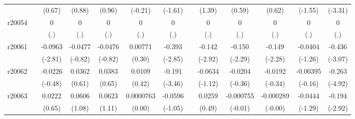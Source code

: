 {\begin{tabular}{l*{12}{c}}
            &                     &      (0.67)         &      (0.88)         &      (0.96)         &     (-0.21)         &     (-1.61)         &                     &      (1.39)         &      (0.59)         &      (0.62)         &     (-1.55)         &     (-3.31)         \\
[1em]
r20054      &                     &           0         &           0         &           0         &           0         &           0         &                     &           0         &           0         &           0         &           0         &           0         \\
            &                     &         (.)         &         (.)         &         (.)         &         (.)         &         (.)         &                     &         (.)         &         (.)         &         (.)         &         (.)         &         (.)         \\
[1em]
r20061      &                     &     -0.0963\sym{**} &     -0.0477         &     -0.0476         &     0.00771         &      -0.393\sym{**} &                     &      -0.142\sym{**} &      -0.150\sym{*}  &      -0.149\sym{*}  &     -0.0404         &      -0.436\sym{**} \\
            &                     &     (-2.81)         &     (-0.82)         &     (-0.82)         &      (0.30)         &     (-2.85)         &                     &     (-2.92)         &     (-2.29)         &     (-2.28)         &     (-1.26)         &     (-3.07)         \\
[1em]
r20062      &                     &     -0.0226         &      0.0362         &      0.0383         &      0.0109         &      -0.191\sym{**} &                     &     -0.0634         &     -0.0204         &     -0.0192         &    -0.00395         &      -0.263\sym{***}\\
            &                     &     (-0.48)         &      (0.61)         &      (0.65)         &      (0.42)         &     (-3.46)         &                     &     (-1.12)         &     (-0.36)         &     (-0.34)         &     (-0.16)         &     (-4.92)         \\
[1em]
r20063      &                     &      0.0222         &      0.0606         &      0.0623         &   0.0000763         &     -0.0596         &                     &      0.0259         &   -0.000755         &   -0.000289         &     -0.0444         &      -0.194\sym{**} \\
            &                     &      (0.65)         &      (1.08)         &      (1.11)         &      (0.00)         &     (-1.05)         &                     &      (0.49)         &     (-0.01)         &     (-0.00)         &     (-1.29)         &     (-2.92)         \\

\end{tabular}}
